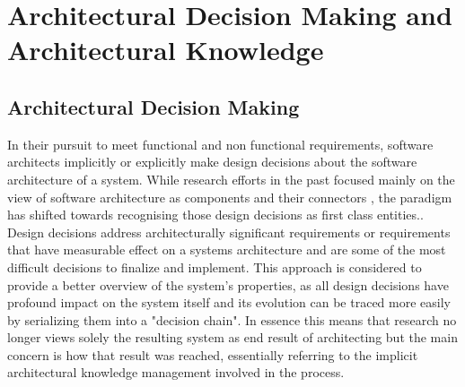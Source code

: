 \chapter{Architectural Decision Making and Architectural Knowledge}
    \section{Architectural Decision Making}
        In their pursuit to meet functional and non functional requirements, software architects implicitly or explicitly make design decisions about the software architecture of a system. While research efforts in the past focused mainly on the view of software architecture as components and their connectors \cite{software_arch_in_practice_book}, the paradigm has shifted towards recognising those design decisions as first class entities.\cite{first-class-Arch-decisions}. Design decisions address architecturally significant requirements or requirements that have measurable effect on a systems architecture and are some of the most difficult decisions to finalize and implement\cite{software_arch_in_practice_book}. This approach is considered to provide a better overview of the system's properties, as all design decisions have profound impact on the system itself and its evolution can be traced more easily by serializing them into a "decision chain". In essence this means that research no longer views solely the resulting system as end result of architecting but the main concern is how that result was reached, essentially referring to the implicit architectural knowledge management involved in the process.

